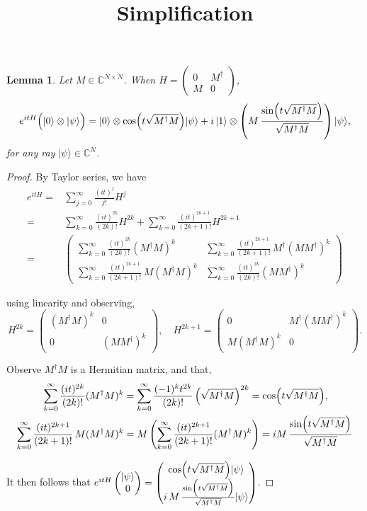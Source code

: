 \documentclass{article}
\newtheorem{lemma}{Lemma}
\begin{document}
\title{Simplification}
\maketitle
\begin{lemma}
Let \(M\in\mathbb{C}^{N\times N}\). When
\(H = \begin{pmatrix} 0 & M^\dagger \\ M & 0 \end{pmatrix}\), \[
e^{itH}\Bigl(|0\rangle\otimes|\psi\rangle\Bigr) = |0\rangle\otimes \cos\Bigl(t\sqrt{M^\dagger M}\Bigr)|\psi\rangle + i\,|1\rangle\otimes \left(M\,\frac{\sin\Bigl(t\sqrt{M^\dagger M}\Bigr)}{\sqrt{M^\dagger M}}\right)|\psi\rangle,
\]
for any ray \( |\psi\rangle\in \mathbb{C}^{N}\).
\end{lemma}


\begin{proof}
    By Taylor series, we have
\begin{align*}
    e^{itH} = & \sum_{j=0}^{\infty}\frac{(it)^j}{j!}H^j \nonumber \\ = & \sum_{k=0}^{\infty} \frac{(it)^{2k}}{(2k)!}H^{2k} + \sum_{k=0}^{\infty} \frac{(it)^{2k+1}}{(2k+1)!}H^{2k+1} \nonumber \\
    = & \begin{pmatrix}
\sum\limits_{k=0}^{\infty} \frac{(it)^{2k}}{(2k)!}(M^\dagger M)^k & \sum\limits_{k=0}^{\infty} \frac{(it)^{2k+1}}{(2k+1)!}\, M^\dagger (MM^\dagger)^k \\[1mm]
\sum\limits_{k=0}^{\infty} \frac{(it)^{2k+1}}{(2k+1)!}\, M (M^\dagger M)^k & \sum\limits_{k=0}^{\infty} \frac{(it)^{2k}}{(2k)!}(MM^\dagger)^k
\end{pmatrix}
\end{align*}

using linearity and observing,
\[
H^{2k} = \begin{pmatrix} (M^\dagger M)^k & 0 \\ 0 & (MM^\dagger)^k \end{pmatrix}, \quad 
H^{2k+1} = \begin{pmatrix} 0 & M^\dagger (MM^\dagger)^k \\ M (M^\dagger M)^k & 0 \end{pmatrix}.
\]

Observe \(M^\dagger M\) is a Hermitian matrix, and that, 
\begin{align*}
\sum_{k=0}^{\infty} \frac{(it)^{2k}}{(2k)!}(M^\dagger M)^k & 
 = \sum_{k=0}^{\infty} \frac{(-1)^k t^{2k}}{(2k)!} \left(\sqrt{M^\dagger M}\right)^{2k} = \cos\Bigl(t\sqrt{M^\dagger M}\Bigr),   \\
\sum_{k=0}^{\infty}\frac{(it)^{2k+1}}{(2k+1)!}\,M (M^\dagger M)^k 
& = M \left( \sum_{k=0}^{\infty}\frac{(it)^{2k+1}}{(2k+1)!}(M^\dagger M)^k \right)
= i M\,\frac{\sin\Bigl(t\sqrt{M^\dagger M}\Bigr)}{\sqrt{M^\dagger M}}
\end{align*}

It then follows that \(e^{itH} \begin{pmatrix} |\psi\rangle \\ 0 \end{pmatrix} = \begin{pmatrix}
\cos\Bigl(t\sqrt{M^\dagger M}\Bigr)|\psi\rangle \\[1mm]
i\,M\,\frac{\sin\Bigl(t\sqrt{M^\dagger M}\Bigr)}{\sqrt{M^\dagger M}}|\psi\rangle
\end{pmatrix}\).


\end{proof}
\end{document}
